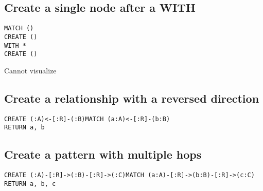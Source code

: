 \subsection{Create a single node after a WITH}

\begin{lstlisting}
MATCH ()
CREATE ()
WITH *
CREATE ()
\end{lstlisting}

Cannot visualize
\subsection{Create a relationship with a reversed direction}

\begin{lstlisting}
CREATE (:A)<-[:R]-(:B)MATCH (a:A)<-[:R]-(b:B)
RETURN a, b
\end{lstlisting}

\subsection{Create a pattern with multiple hops}

\begin{lstlisting}
CREATE (:A)-[:R]->(:B)-[:R]->(:C)MATCH (a:A)-[:R]->(b:B)-[:R]->(c:C)
RETURN a, b, c
\end{lstlisting}

